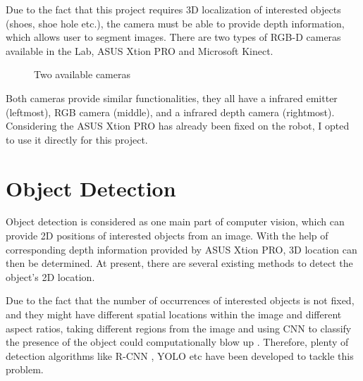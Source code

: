 Due to the fact that this project requires 3D localization of interested objects (shoes, shoe hole etc.), the camera must be able to provide depth information, which allows user to segment images. There are two types of RGB-D cameras available in the Lab, ASUS Xtion PRO and Microsoft Kinect.

\begin{figure}[H]
\centering
{}
\caption{Two available cameras}
\label{camera}
\end{figure}

Both cameras provide similar functionalities, they all have a infrared emitter (leftmost), RGB camera (middle), and a infrared depth camera (rightmost). Considering the ASUS Xtion PRO has already been fixed on the robot, I opted to use it directly for this project.

\section{Object Detection} \label{od}
Object detection is considered as one main part of computer vision, which can provide 2D positions of interested objects from an image. With the help of corresponding depth information provided by ASUS Xtion PRO, 3D location can then be determined. At present, there are several existing methods to detect the object's 2D location.

Due to the fact that the number of occurrences of interested objects is not fixed, and they might have different spatial locations within the image and different aspect ratios, taking different regions from the image and using CNN to classify the presence of the object could computationally blow up \citep{RCNNFast65:online}. Therefore, plenty of detection algorithms like R-CNN \citep{RCNN}, YOLO \citep{YOLO} etc have been developed to tackle this problem. 

